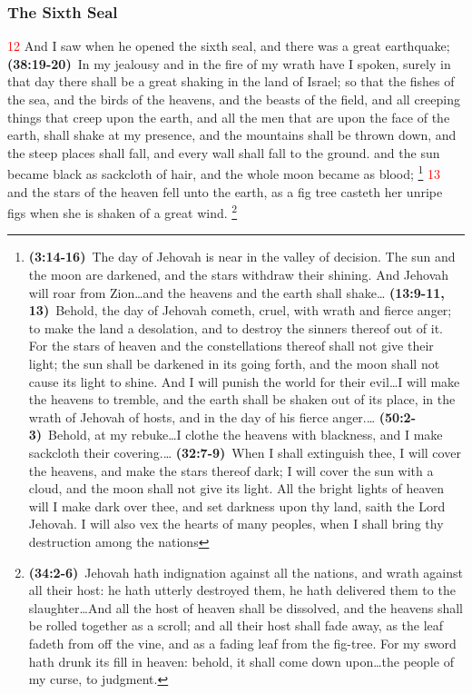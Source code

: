 \documentclass[12pt,twoside]{memoir}
\newcommand{\cbibleref}[3]{\textbf{\ibibleverse[textit]{#1}(#2)}\ {#3}}
\newcommand{\cbiblechvs}[3]{\textbf{\ibiblechvs[textit]{#1}(#2)}\ {#3}}
\newcommand{\cbiblefoot}[3]{\footnote{\cbibleref{#1}{#2}{#3}}}
\newcommand{\vnum}[1]{\textcolor{red}{\normalsize{#1}}}
\begin{document}
\subsubsection*{The Sixth Seal}
\vnum{12} And I saw when he opened the sixth seal, and there was a great earthquake;%
	\cbibleref{Ezekiel}{38:19-20}{In my jealousy and in the fire of my wrath have I spoken, surely in that day there shall be a great shaking in the land of Israel; so that the fishes of the sea, and the birds of the heavens, and the beasts of the field, and all creeping things that creep upon the earth, and all the men that are upon the face of the earth, shall shake at my presence, and the mountains shall be thrown down, and the steep places shall fall, and every wall shall fall to the ground.}
 and the sun became black as sackcloth of hair, and the whole moon became as blood;
 	\footnote{
 		\cbibleref{Joel}{3:14-16}{The day of Jehovah is near in the valley of decision. The sun and the moon are darkened, and the stars withdraw their shining. And Jehovah will roar from Zion\ldots and the heavens and the earth shall shake}\ldots%
 		\cbibleref{Isaiah}{13:9-11, 13}{Behold, the day of Jehovah cometh, cruel, with wrath and fierce anger; to make the land a desolation, and to destroy the sinners thereof out of it. For the stars of heaven and the constellations thereof shall not give their light; the sun shall be darkened in its going forth, and the moon shall not cause its light to shine. And I will punish the world for their evil\ldots I will make the heavens to tremble, and the earth shall be shaken out of its place, in the wrath of Jehovah of hosts, and in the day of his fierce anger.}\ldots%
 		\cbiblechvs{Isaiah}{50:2-3}{Behold, at my rebuke\ldots I clothe the heavens with blackness, and I make sackcloth their covering.}\ldots%
 		\cbibleref{Ezekiel}{32:7-9}{When I shall extinguish thee, I will cover the heavens, and make the stars thereof dark; I will cover the sun with a cloud, and the moon shall not give its light. All the bright lights of heaven will I make dark over thee, and set darkness upon thy land, saith the Lord Jehovah. I will also vex the hearts of many peoples, when I shall bring thy destruction among the nations}%
 	} %
\vnum{13} and the stars of the heaven fell unto the earth, as a fig tree casteth her unripe figs when she is shaken of a great wind.
	\cbiblefoot{Isaiah}{34:2-6}{Jehovah hath indignation against all the nations, and wrath against all their host: he hath utterly destroyed them, he hath delivered them to the slaughter\ldots And all the host of heaven shall be dissolved, and the heavens shall be rolled together as a scroll; and all their host shall fade away, as the leaf fadeth from off the vine, and as a fading leaf from the fig-tree. For my sword hath drunk its fill in heaven: behold, it shall come down upon\ldots the people of my curse, to judgment.} %
\end{document}
